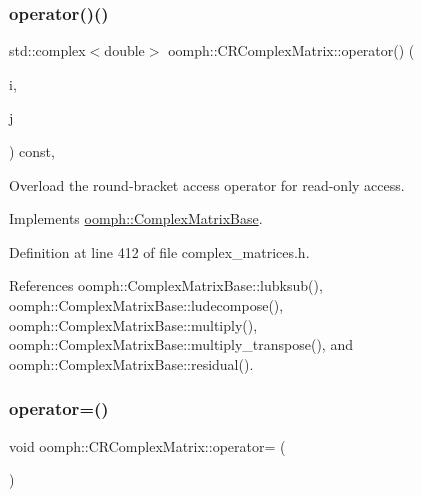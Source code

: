 \mbox{\label{classoomph_1_1CRComplexMatrix_a1a800a78ffb803e931d6884c66e9220d}} 
\subsubsection{\texorpdfstring{operator()()}{operator()()}}
{\footnotesize\ttfamily std\+::complex$<$double$>$ oomph\+::\+C\+R\+Complex\+Matrix\+::operator() (\begin{DoxyParamCaption}\item[{const unsigned long \&}]{i,  }\item[{const unsigned long \&}]{j }\end{DoxyParamCaption}) const\hspace{0.3cm}{\ttfamily [inline]}, {\ttfamily [virtual]}}



Overload the round-\/bracket access operator for read-\/only access. 



Implements \hyperlink{classoomph_1_1ComplexMatrixBase_a78d1185ec8249fec5855d01129a1c870}{oomph\+::\+Complex\+Matrix\+Base}.



Definition at line 412 of file complex\+\_\+matrices.\+h.



References oomph\+::\+Complex\+Matrix\+Base\+::lubksub(), oomph\+::\+Complex\+Matrix\+Base\+::ludecompose(), oomph\+::\+Complex\+Matrix\+Base\+::multiply(), oomph\+::\+Complex\+Matrix\+Base\+::multiply\+\_\+transpose(), and oomph\+::\+Complex\+Matrix\+Base\+::residual().

\mbox{\label{classoomph_1_1CRComplexMatrix_a2c71c4bab418cf3fd362072f5c5587d2}} 
\subsubsection{\texorpdfstring{operator=()}{operator=()}}
{\footnotesize\ttfamily void oomph\+::\+C\+R\+Complex\+Matrix\+::operator= (\begin{DoxyParamCaption}\item[{const \hyperlink{classoomph_1_1CRComplexMatrix}{C\+R\+Complex\+Matrix} \&}]{ }\end{DoxyParamCaption})\hspace{0.3cm}{\ttfamily [inline]}}




